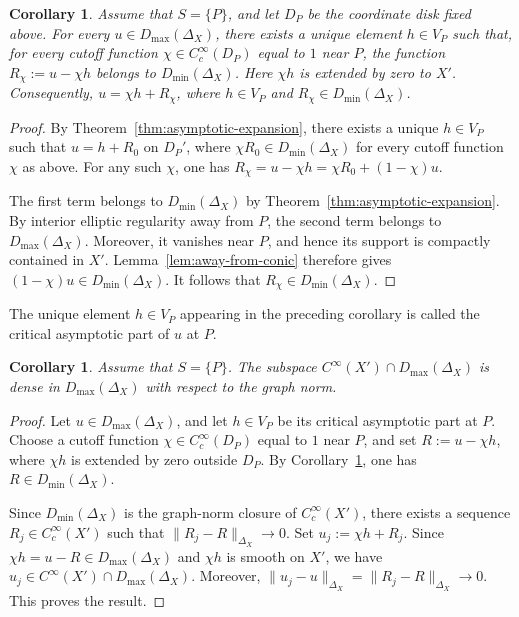 \documentclass[12pt]{amsart}
\theoremstyle{plain}
\newtheorem{cor}[thm]{Corollary}
\theoremstyle{definition}
\theoremstyle{remark}
\numberwithin{equation}{section} \numberwithin{figure}{section}
\renewcommand*{\to}{\rightarrow}
\begin{document}
\begin{cor}\label{thm:global-decomposition-single-point}
Assume that \(S=\{P\}\), and let \(D_P\) be the coordinate disk fixed
above. For every \(u\in D_{\max}(\Delta_X)\), there exists a unique
element \(h\in V_P\) such that, for every cutoff function
\(\chi\in C_c^\infty(D_P)\) equal to \(1\) near \(P\), the function
\(R_\chi:=u-\chi h\) belongs to \(D_{\min}(\Delta_X)\). Here \(\chi h\)
is extended by zero to \(X'\). Consequently,
\(u=\chi h+R_\chi\), where \(h\in V_P\) and
\(R_\chi\in D_{\min}(\Delta_X)\).
\end{cor}

\begin{proof}
By Theorem~\ref{thm:asymptotic-expansion}, there exists a unique
\(h\in V_P\) such that \(u=h+R_0\) on \(D_P'\), where
\(\chi R_0\in D_{\min}(\Delta_X)\) for every cutoff function \(\chi\)
as above. For any such \(\chi\), one has
\(R_\chi=u-\chi h=\chi R_0+(1-\chi)u\).

The first term belongs to \(D_{\min}(\Delta_X)\) by
Theorem~\ref{thm:asymptotic-expansion}. By interior elliptic regularity
away from \(P\), the second term belongs to \(D_{\max}(\Delta_X)\).
Moreover, it vanishes near \(P\), and hence its support is compactly
contained in \(X'\). Lemma~\ref{lem:away-from-conic} therefore gives
\((1-\chi)u\in D_{\min}(\Delta_X)\). It follows that
\(R_\chi\in D_{\min}(\Delta_X)\).
\end{proof}



The unique element \(h\in V_P\) appearing in the preceding corollary is
called the critical asymptotic part of \(u\) at \(P\).



\begin{cor}\label{cor:smooth-density}
Assume that \(S=\{P\}\). The subspace
\(C^\infty(X')\cap D_{\max}(\Delta_X)\) is dense in
\(D_{\max}(\Delta_X)\) with respect to the graph norm.
\end{cor}

\begin{proof}
Let \(u\in D_{\max}(\Delta_X)\), and let \(h\in V_P\) be its critical
asymptotic part at \(P\). Choose a cutoff function
\(\chi\in C_c^\infty(D_P)\) equal to \(1\) near \(P\), and set
\(R:=u-\chi h\), where \(\chi h\) is extended by zero outside \(D_P\).
By Corollary~\ref{thm:global-decomposition-single-point}, one has
\(R\in D_{\min}(\Delta_X)\).

Since \(D_{\min}(\Delta_X)\) is the graph-norm closure of
\(C_c^\infty(X')\), there exists a sequence
\(R_j\in C_c^\infty(X')\) such that
\(\|R_j-R\|_{\Delta_X}\to0\). Set \(u_j:=\chi h+R_j\). Since
\(\chi h=u-R\in D_{\max}(\Delta_X)\) and \(\chi h\) is smooth on
\(X'\), we have
\(u_j\in C^\infty(X')\cap D_{\max}(\Delta_X)\). Moreover,
\(\|u_j-u\|_{\Delta_X}=\|R_j-R\|_{\Delta_X}\to0\). This proves the
result.
\end{proof}
\end{document}

